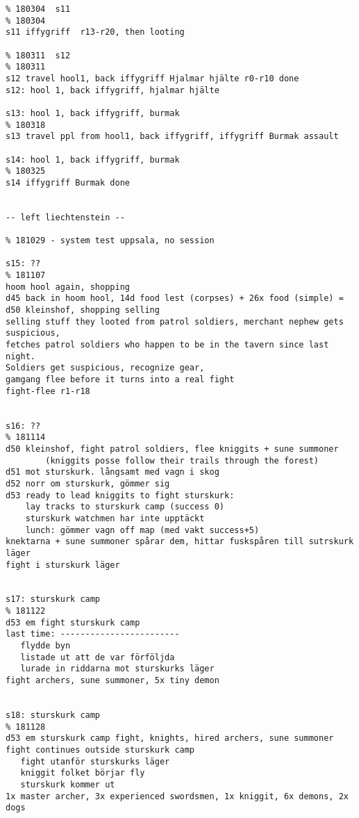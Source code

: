 \begin{verbatim}
% 180304  s11                                                           % 180304
s11 iffygriff  r13-r20, then looting

% 180311  s12                                                           % 180311
s12 travel hool1, back iffygriff Hjalmar hjälte r0-r10 done
s12: hool 1, back iffygriff, hjalmar hjälte

s13: hool 1, back iffygriff, burmak                                     % 180318
s13 travel ppl from hool1, back iffygriff, iffygriff Burmak assault

s14: hool 1, back iffygriff, burmak                                     % 180325
s14 iffygriff Burmak done


-- left liechtenstein --

% 181029 - system test uppsala, no session

s15: ??                                                                 % 181107
hoom hool again, shopping
d45 back in hoom hool, 14d food lest (corpses) + 26x food (simple) =  
d50 kleinshof, shopping selling
selling stuff they looted from patrol soldiers, merchant nephew gets suspicious,
fetches patrol soldiers who happen to be in the tavern since last night.
Soldiers get suspicious, recognize gear,
gamgang flee before it turns into a real fight
fight-flee r1-r18


s16: ??                                                                 % 181114
d50 kleinshof, fight patrol soldiers, flee kniggits + sune summoner
        (kniggits posse follow their trails through the forest)
d51 mot sturskurk. långsamt med vagn i skog
d52 norr om sturskurk, gömmer sig
d53 ready to lead kniggits to fight sturskurk:
    lay tracks to sturskurk camp (success 0)
    sturskurk watchmen har inte upptäckt
    lunch: gömmer vagn off map (med vakt success+5)
knektarna + sune summoner spårar dem, hittar fuskspåren till sutrskurk läger
fight i sturskurk läger


s17: sturskurk camp                                                     % 181122
d53 em fight sturskurk camp
last time: ------------------------
   flydde byn
   listade ut att de var förföljda
   lurade in riddarna mot sturskurks läger
fight archers, sune summoner, 5x tiny demon


s18: sturskurk camp                                                     % 181128
d53 em sturskurk camp fight, knights, hired archers, sune summoner
fight continues outside sturskurk camp
   fight utanför sturskurks läger
   kniggit folket börjar fly
   sturskurk kommer ut
1x master archer, 3x experienced swordsmen, 1x kniggit, 6x demons, 2x dogs



\end{verbatim}
